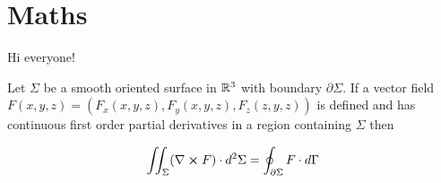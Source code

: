 \section{Maths}
Hi everyone!

\begin{theorem}
    Let \(\Sigma\) be a smooth oriented surface in \(\mathbb{R}^3\) with boundary \(\partial\Sigma\). If a vector field \(F(x, y, z) = (F_x(x, y, z), F_y(x, y, z), F_z(z, y, z))\) is defined and has continuous first order partial derivatives in a region containing \(\Sigma\) then

    \[
        \iint_\Sigma (\nabla \cross F) \cdot d^2\Sigma = \oint_{\partial\Sigma} F \cdot d\Gamma
    \]
\end{theorem}